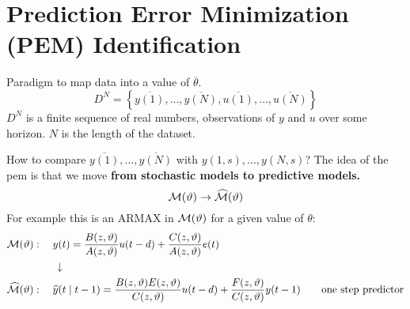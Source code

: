 \section{Prediction Error Minimization (PEM) Identification}

Paradigm to map data into a value of $\overline{\theta}$.
$$
	D^N=\left\{\overline{y(1)},\ldots,\overline{y(N)},\overline{u(1)},\ldots,\overline{u(N)}\right\}
$$
$D^N$ is a finite sequence of real numbers, observations of $y$ and $u$ over some horizon. $N$ is the length of the dataset.

How to compare $\overline{y(1)},\ldots,\overline{y(N)}$ with $y(1,s),\ldots,y(N,s)$?
The idea of the \gls{pem} is that we move \textbf{from stochastic models to predictive models.}
\[
	\mathcal{M}(\vartheta) \to \widehat{\mathcal{M}}(\vartheta)
\]
For example this is an ARMAX in $\mathcal{M}(\vartheta)$ for a given value of $\theta$:
\begin{align*}
	\mathcal{M}(\vartheta)&:\quad y(t)=\frac{B(z, \vartheta)}{A(z, \vartheta)} u(t-d)+\frac{C(z, \vartheta)}{A(z, \vartheta)} e(t)\\
	&\qquad\downarrow\\
	\widehat{\mathcal{M}}(\vartheta)&: \quad \widehat{y}(t \mid t-1) =\frac{B(z,\vartheta) E(z,\vartheta)}{C(z,\vartheta)} u(t-d)+\frac{F(z,\vartheta)}{C(z,\vartheta)} y(t-1) \qquad \text{one step predictor}
\end{align*}

